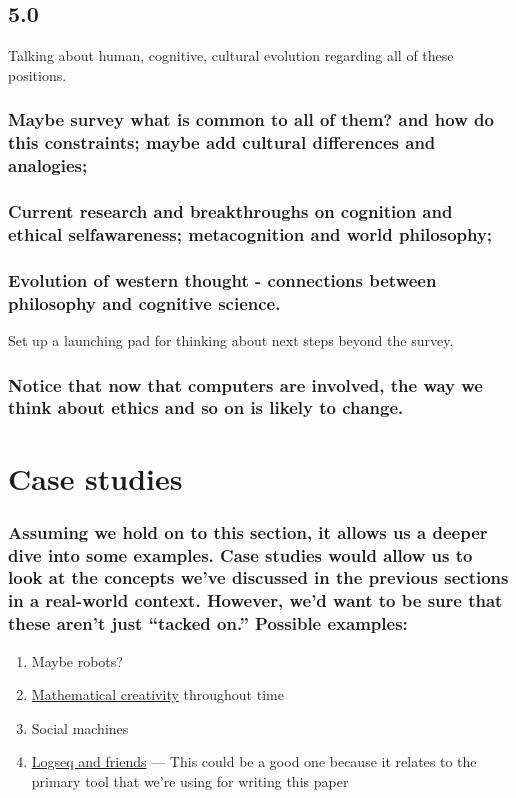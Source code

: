 \documentclass[11pt]{article}
\begin{document}
\subsection{5.0}
\label{sec:org887356d}

Talking about human, cognitive, cultural evolution regarding all of these positions.

\subsubsection{Maybe survey what is common to all of them? and how do this constraints; maybe add cultural differences and analogies;}
\label{sec:orgb7d0b05}
\subsubsection{Current research and breakthroughs on cognition and ethical selfawareness; metacognition and world philosophy;}
\label{sec:orga71a894}
\subsubsection{Evolution of western thought - connections between philosophy and cognitive science.}
\label{sec:org270820e}
Set up a launching pad for thinking about next steps beyond the survey.
\subsubsection{Notice that now that computers are involved, the way we think about ethics and so on is likely to change.}
\label{sec:org884fd35}
\section{Case studies}
\label{sec:orga7d5b63}
\subsubsection{Assuming we hold on to this section, it allows us a deeper dive into some examples. Case studies would allow us to look at the concepts we've discussed in the previous sections in a real-world context. However, we’d want to be sure that these aren’t just “tacked on.” Possible examples:}
\label{sec:orgbd4f311}
\begin{enumerate}
\item Maybe robots?
\label{sec:org28062fc}
\item \hyperref[sec:org36972a8]{Mathematical creativity} throughout time
\label{sec:orgea179e9}
\item Social machines
\label{sec:org96b9110}
\item \hyperref[sec:orge34f081]{Logseq and friends} — This could be a good one because it relates to the primary tool that we're using for writing this paper
\label{sec:org9112a2a}
\end{enumerate}
\end{document}
